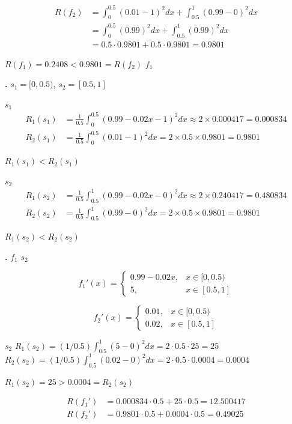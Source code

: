 \documentclass[
  12pt,
]{article}
\begin{document}
\[\begin{aligned}
R(f_2) &= \int_0^{0.5} (0.01 - 1)^2 dx + \int_{0.5}^1 (0.99 - 0)^2 dx \\
&= \int_0^{0.5} (0.99)^2 dx + \int_{0.5}^1 (0.99)^2 dx \\
&= 0.5 \cdot 0.9801 + 0.5 \cdot 0.9801 = 0.9801
\end{aligned}\]

 \(R(f_1) = 0.2408 < 0.9801 = R(f_2)\) \(f_1\)


\textbf{.}  \(s_1 = [0, 0.5)\),
\(s_2 = [0.5, 1]\)

 \(s_1\)  \[\begin{aligned}
R_1(s_1) &= \frac{1}{0.5} \int_0^{0.5} (0.99 - 0.02x - 1)^2 dx \approx 2 \times 0.000417 = 0.000834 \\
R_2(s_1) &= \frac{1}{0.5} \int_0^{0.5} (0.01 - 1)^2 dx = 2 \times 0.5 \times 0.9801 = 0.9801
\end{aligned}\]

\(R_1(s_1) < R_2(s_1)\)

 \(s_2\)  \[\begin{aligned}
R_1(s_2) &= \frac{1}{0.5} \int_{0.5}^1 (0.99 - 0.02x - 0)^2 dx \approx 2 \times 0.240417 = 0.480834 \\
R_2(s_2) &= \frac{1}{0.5} \int_{0.5}^1 (0.99 - 0)^2 dx = 2 \times 0.5 \times 0.9801 = 0.9801
\end{aligned}\]

 \(R_1(s_2) < R_2(s_2)\)

\textbf{.}  \(f_1\)  \(s_2\) 

\[f_1'(x) = \begin{cases}
0.99 - 0.02x, & x \in [0, 0.5) \\
5, & x \in [0.5, 1]
\end{cases}\]

\[f_2'(x) = \begin{cases}
0.01, & x \in [0, 0.5) \\
0.02, & x \in [0.5, 1]
\end{cases}\]

 \(s_2\)
\(R_1(s_2) = (1/0.5)\int_{0.5}^1 (5 - 0)^2 dx = 2 \cdot 0.5\cdot 25 = 25\)\(R_2(s_2) = (1/0.5)\int_{0.5}^1 (0.02-0)^2 dx = 2 \cdot 0.5\cdot 0.0004 = 0.0004\)

 \(R_1(s_2) = 25 > 0.0004 = R_2(s_2)\)

 \[\begin{aligned}
R(f_1') &= 0.000834 \cdot 0.5 + 25 \cdot 0.5 = 12.500417 \\
R(f_2') &= 0.9801 \cdot 0.5 + 0.0004 \cdot 0.5 = 0.49025
\end{aligned}\]
\end{document}

